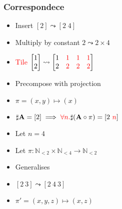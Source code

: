 \documentclass[xetex,mathserif,serif]{beamer}
\let\amsleadsto\leadsto
\let\leadsto\amsleadsto
\newcommand\mrm[1]{\mathrm{#1}}
\newcommand\brm[1]{\bm{\mrm{#1}}}
\newcommand\Nat{\mathbb{N}}
\newcommand\NB[1]{\textcolor{red}{#1}}
\begin{document}
\begin{frame}
  \frametitle{Correspondece}
  \begin{itemize}%
    \item Insert $[2] \leadsto [2\;4]$
    \item Multiply by constant $2\leadsto 2\times 4$
    \item \NB{Tile} $
      \begin{bmatrix} 1 \\ 2 \end{bmatrix}\leadsto
      \begin{bmatrix} 1 & \NB 1 & \NB 1 & \NB  1 \\ 2 & \NB 2 & \NB 2 & \NB 2 \end{bmatrix}
    $
    \item Precompose with projection
    \item $\pi = (x, y) \mapsto (x)$
    \item $\sharp \brm A = [2] \implies \NB{\forall n.} \sharp(\brm A \circ \pi) = [2\ \NB n]$
    \item Let $n = 4$
    \item Let $\pi : \Nat_{<2} \times \Nat_{<4} \to \Nat_{<2}$
    \item Generalises
    \item $[2\ 3] \leadsto [2\ 4\ 3]$
    \item $\pi' = (x, y, z) \mapsto (x, z)$
  \end{itemize}
\end{frame}
\end{document}
